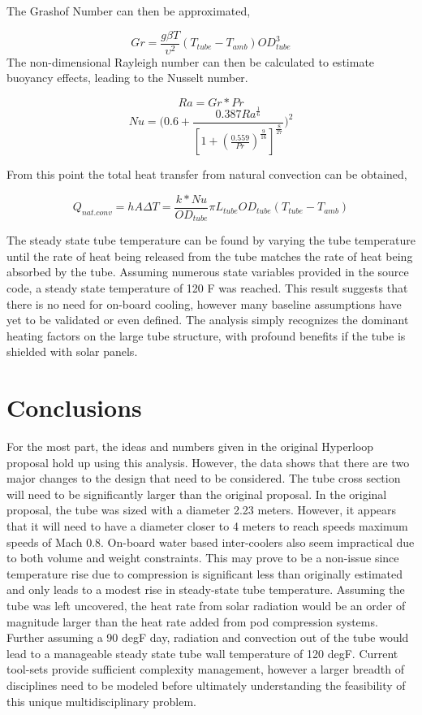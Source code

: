 \documentclass[heading.tex]{subfiles}
\begin{document}
The Grashof Number can then be approximated,

\begin{equation}
Gr = \frac{g \beta T} {\upsilon^2}  (T_{tube}-T_{amb}) {OD}_{tube}^3
\end{equation}
The non-dimensional Rayleigh number can then be calculated to estimate buoyancy effects, leading to the Nusselt number.

\begin{equation}
Ra = Gr * Pr
\end{equation}
\begin{equation}
Nu = \Bigg(0.6 + \frac{0.387Ra^{\frac{1}{6}}}{[1+(\frac{0.559}{Pr})^{\frac{9}{16}}]^{\frac{8}{27}}}\Bigg)^2
\end{equation}

From this point the total heat transfer from natural convection can be obtained,

\begin{equation}
Q_{nat. conv} = hA \Delta T = \frac{k*Nu}{ {OD}_{tube}} \pi {L}_{tube} {OD}_{tube} (T_{tube}-T_{amb})
\end{equation}

The steady state tube temperature can be found by varying the tube temperature until the rate of heat being released from the tube
matches the rate of heat being absorbed by the tube.
Assuming numerous state variables provided in the source code, a steady state temperature of 120 F was reached.
This result suggests that there is no need for on-board cooling, however many baseline assumptions have yet to be validated or even defined.
The analysis simply recognizes the dominant heating factors on the large tube structure, with profound benefits if the tube is shielded with solar panels. 

\section{Conclusions}

For the most part, the ideas and numbers given in the original Hyperloop proposal hold up using this analysis. However, the data shows that
there are two major changes to the design that need to be considered.
The tube cross section will need to be significantly larger than the original proposal. In the original proposal, the tube was sized with a diameter 2.23
meters. However, it appears that it will need to have a diameter closer to 4 meters to reach speeds maximum speeds of Mach 0.8.
On-board water based inter-coolers also seem impractical due to both volume and weight constraints. This may prove to be a non-issue since
temperature rise due to compression is significant less than originally estimated and only leads to a modest rise in steady-state tube
temperature. Assuming the tube was left uncovered, the heat rate from solar radiation would be an order of magnitude larger than the heat
rate added from pod compression systems. Further assuming a 90 degF day, radiation and convection out of the tube would lead to a
manageable steady state tube wall temperature of 120 degF. 
Current tool-sets provide sufficient complexity management, however a larger breadth of disciplines need to be modeled before ultimately
understanding the feasibility of this unique multidisciplinary problem.
\end{document}
